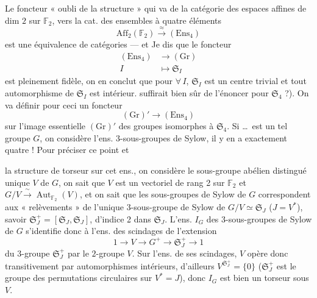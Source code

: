 \documentclass[11pt,a4paper]{article}
\begin{document}
Le foncteur « oubli de la structure » qui va de la catégorie des espaces
affines de dim $2$ sur $\mathbb{F}_2$, vers la cat. des ensembles à quatre
éléments
\[
  \mathrm{Aff}_2(\mathbb{F}_2) \xrightarrow{\;\approx\;} (\mathrm{Ens}_4)
\]
est une équivalence de catégories --- et \struck{\ill{}}
 Je dis que le foncteur
\[
  \begin{aligned}
    (\mathrm{Ens}_4) &\longrightarrow (\mathrm{Gr}) \\
    I &\longmapsto \mathfrak{S}_I
  \end{aligned}
\]
est pleinement fidèle, on en conclut que pour $\forall\, I$,
$\mathfrak{S}_I$ est un centre trivial et tout automorphisme de
$\mathfrak{S}_I$ est intérieur.  
suffirait bien sûr de l'énoncer pour $\mathfrak{S}_4$ ?). On va définir pour
ceci un foncteur \ill{}
\[
  (\mathrm{Gr})' \longrightarrow (\mathrm{Ens}_4)
\]
sur l'image essentielle $(\mathrm{Gr})'$ des groupes isomorphes à
$\mathfrak{S}_4$. Si \ldots\ est un tel groupe $G$, on considère l'ens.
\struck{\ill{}}  \struck{\ill{}} $3$-sous-groupes de Sylow, il y en a
exactement quatre ! Pour préciser ce point et 

la structure de torseur sur cet ens., on considère le sous-groupe abélien
distingué \struck{\ill{}} unique $V$ de $G$, on sait que $V$ est un
vectoriel de rang 2 sur $\mathbb{F}_2$ et
$G/V \xrightarrow{\;\sim\;} \operatorname{Aut}_{\mathbb{F}_2}(V)$, et on
sait que les sous-groupes de Sylow de $G$ correspondent aux
« relèvements » de l'unique $3$-sous-groupe de Sylow de
$G/V \simeq \mathfrak{S}_J$ ($J = V^*$), savoir
$\mathfrak{S}_J^+ = [\mathfrak{S}_J, \mathfrak{S}_J]$, d'indice 2 dans
$\mathfrak{S}_J$. \struck{\ill{}} L'ens. $I_G$ des $3$-sous-groupes de Sylow
de $G$ s'identifie donc à l'ens. des scindages de l'extension
\[
  1 \to V \to G^+ \to \mathfrak{S}_J^+ \to 1
\]
du $3$-groupe $\mathfrak{S}_J^+$ par le $2$-groupe $V$. Sur l'ens. de ses
scindages, $V$ opère donc transitivement par automorphismes intérieurs,
d'ailleurs $V^{\mathfrak{S}_J^+} = \{0\}$ ($\mathfrak{S}_J^+$ est le groupe des
permutations circulaires sur $V^* = J$), donc $I_G$ est bien un torseur sous
$V$.
\end{document}
